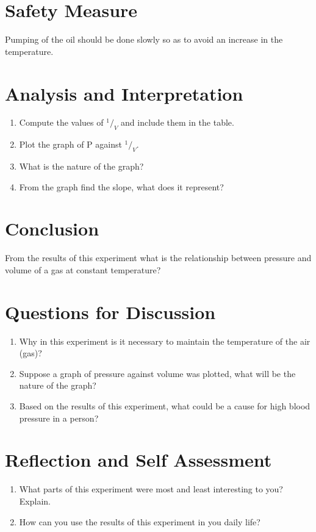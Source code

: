\section{Safety Measure}
Pumping of the oil should be done slowly so as to avoid an increase in the temperature.

\section{Analysis and Interpretation}
\begin{enumerate}
\item Compute the values of $^1/_V$ and include them in the table.
\item Plot the graph of P against $^1/_V$.
\item What is the nature of the graph?
\item From the graph find the slope, what does it represent?
\end{enumerate}

\section{Conclusion}
From the results of this experiment what is the relationship between pressure and volume of a gas at constant temperature?

\section{Questions for Discussion}
\begin{enumerate}
\item Why in this experiment is it necessary to maintain the temperature of the air (gas)?
\item Suppose a graph of pressure against volume was plotted, what will be the nature of the graph?
\item Based on the results of this experiment, what could be a cause for high blood pressure in a person?
\end{enumerate}

\section{Reflection and Self Assessment}
\begin{enumerate}
\item What parts of this experiment were most and least interesting to you? Explain.
\item How can you use the results of this experiment in you daily life? 
\end{enumerate}